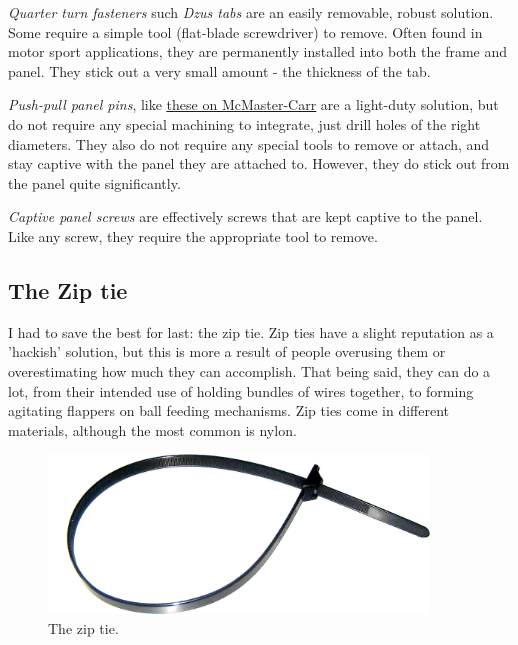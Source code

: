\documentclass[10pt,letterpaper]{book}
\begin{document}
	\begin{asparaenum}[a)]
		\item \textit{Quarter turn fasteners} such \textit{Dzus tabs} are an easily removable, robust solution. Some require a simple tool (flat-blade screwdriver) to remove. Often found in motor sport applications, they are permanently installed into both the frame and panel. They stick out a very small amount - the thickness of the tab.
		\item \textit{Push-pull panel pins}, like \href{https://www.mcmaster.com/panel-fasteners/screws-and-bolts/push-pull-captive-panel-screws/}{\color{red}\underline{these on McMaster-Carr}} are a light-duty solution, but do not require any special machining to integrate, just drill holes of the right diameters. They also do not require any special tools to remove or attach, and stay captive with the panel they are attached to. However, they do stick out from the panel quite significantly.
		\item \textit{Captive panel screws} are effectively screws that are kept captive to the panel. Like any screw, they require the appropriate tool to remove.
	\end{asparaenum}
	
	\subsection{The Zip tie}
	I had to save the best for last: the zip tie. Zip ties have a slight reputation as a 'hackish' solution, but this is more a result of people overusing them or overestimating how much they can accomplish. That being said, they can do a lot, from their intended use of holding bundles of wires together, to forming agitating flappers on ball feeding mechanisms. Zip ties come in different materials, although the most common is nylon.
	
	\begin{figure}[H]
		\includegraphics[width=0.9\textwidth]{imgs/ziptie.png}
		\caption{The zip tie.}
	\end{figure}
	
\end{document}
